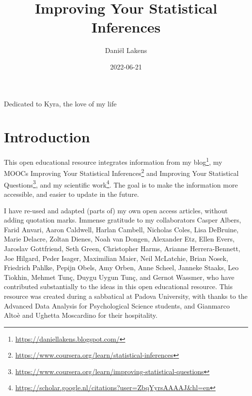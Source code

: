 \documentclass[
  oneside]{krantz}
\title{Improving Your Statistical Inferences}
\author{Daniël Lakens}
\date{2022-06-21}
\renewcommand{\href}[2]{#2\footnote{\url{#1}}}
\begin{document}
\maketitle


\thispagestyle{empty}

\begin{center}
Dedicated to Kyra, the love of my life
\end{center}

\setlength{\abovedisplayskip}{-5pt}
\setlength{\abovedisplayshortskip}{-5pt}

{
\hypersetup{linkcolor=}
\setcounter{tocdepth}{1}
\tableofcontents
}
\listoffigures
\listoftables
\hypertarget{introduction}{%
\chapter*{Introduction}\label{introduction}}


This open educational resource integrates information from my \href{https://daniellakens.blogspot.com/}{blog}, my MOOCs \href{https://www.coursera.org/learn/statistical-inferences}{Improving Your Statistical Inferences} and \href{https://www.coursera.org/learn/improving-statistical-questions}{Improving Your Statistical Questions}, and my \href{https://scholar.google.nl/citations?user=ZbqYyrsAAAAJ\&hl=en}{scientific work}. The goal is to make the information more accessible, and easier to update in the future.

I have re-used and adapted (parts of) my own open access articles, without adding quotation marks. Immense gratitude to my collaborators Casper Albers, Farid Anvari, Aaron Caldwell, Harlan Cambell, Nicholas Coles, Lisa DeBruine, Marie Delacre, Zoltan Dienes, Noah van Dongen, Alexander Etz, Ellen Evers, Jaroslav Gottfriend, Seth Green, Christopher Harms, Arianne Herrera-Bennett, Joe Hilgard, Peder Isager, Maximilian Maier, Neil McLatchie, Brian Nosek, Friedrich Pahlke, Pepijn Obels, Amy Orben, Anne Scheel, Janneke Staaks, Leo Tiokhin, Mehmet Tunç, Duygu Uygun Tunç, and Gernot Wassmer, who have contributed substantially to the ideas in this open educational resource. This resource was created during a sabbatical at Padova University, with thanks to the Advanced Data Analysis for Psychological Science students, and Gianmarco Altoè and Ughetta Moscardino for their hospitality.
\end{document}

